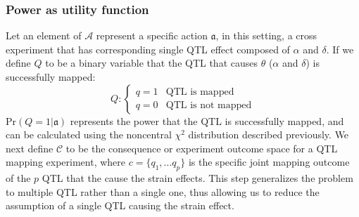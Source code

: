 \subsubsection{Power as utility function}

Let an element of $\mathcal{A}$ represent a specific action $\mathfrak{a}$, in this setting, a cross experiment that has corresponding single QTL effect composed of $\alpha$ and $\delta$. If we define $Q$ to be a binary variable that the QTL that causes $\theta$ ($\alpha$ and $\delta$) is successfully mapped: $$Q: \begin{cases} q=1 & \text{QTL is mapped} \\ q=0 & \text{QTL is not mapped} \end{cases}$$ $\text{Pr}(Q=1|\mathfrak{a})$ represents the power that the QTL is successfully mapped, and can be calculated using the noncentral $\chi^{2}$ distribution described previously. We next define $\mathcal{C}$ to be the consequence or experiment outcome space for a QTL mapping experiment, where $c =\{q_{1}, \hdots q_{p}\}$ is the specific joint mapping outcome of the $p$ QTL that the cause the strain effects. This step generalizes the problem to multiple QTL rather than a single one, thus allowing us to reduce the assumption of a single QTL causing the strain effect.

